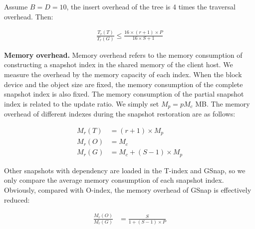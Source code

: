 \documentclass[sigconf, nonacm]{acmart}
\begin{document}
Assume $B=D=10$, the insert overhead of the tree is 4 times the traversal overhead. Then:

\vspace{-0.2cm}
\begin{small}
	\begin{equation}
		\begin{split}
			\frac{T_r(T)}{T_r(G)}\leq \frac{16\times(r+1)\times P}{16\times S +1}
		\end{split}
	\end{equation}
\end{small}
\vspace{-0.2cm}

\textbf{Memory overhead.} Memory overhead refers to the memory consumption of constructing a snapshot index in the shared memory of the client host. We measure the overhead by the memory capacity of each index. When the block device and the object size are fixed, the memory consumption of the complete snapshot index is also fixed. The memory consumption of the partial snapshot index is related to the update ratio. We simply set $M_p = pM_c$ MB.  The memory overhead of different indexes during the snapshot restoration are as follows:

\vspace{-0.2cm}
\begin{small}
	\begin{equation}
		\begin{split}
			M_r(T) &= (r+1) \times M_p\\
			M_r(O) &= M_c\\
			M_r(G) &= M_c + (S-1)\times M_p
		\end{split}
	\end{equation}
\end{small}
\vspace{-0.2cm}

Other snapshots with dependency are loaded in the T-index and GSnap, so we only compare the average memory consumption of each snapshot index. Obviously, compared with O-index, the memory overhead of GSnap is effectively reduced:

\vspace{-0.2cm}
\begin{small}
	\begin{equation}
		\begin{split}
			\frac{M_r(O)}{M_r(G)} &= \frac{S}{1+(S-1)\times P}
		\end{split}
	\end{equation}
\end{small}
\vspace{-0.2cm}
\end{document}
